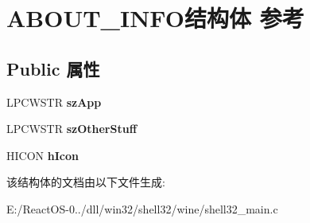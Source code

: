 \hypertarget{struct_a_b_o_u_t___i_n_f_o}{}\section{A\+B\+O\+U\+T\+\_\+\+I\+N\+F\+O结构体 参考}
\label{struct_a_b_o_u_t___i_n_f_o}
\subsection*{Public 属性}
\begin{DoxyCompactItemize}
\item 
\mbox{\label{struct_a_b_o_u_t___i_n_f_o_aedf6a1ef140deacedc1fbb95d2d4ed4b}} 
L\+P\+C\+W\+S\+TR {\bfseries sz\+App}
\item 
\mbox{\label{struct_a_b_o_u_t___i_n_f_o_a8f76a092c137831f7c9e707d89e52244}} 
L\+P\+C\+W\+S\+TR {\bfseries sz\+Other\+Stuff}
\item 
\mbox{\label{struct_a_b_o_u_t___i_n_f_o_aa056c0fff82d9ea9e21cf4e74de9725c}} 
H\+I\+C\+ON {\bfseries h\+Icon}
\end{DoxyCompactItemize}


该结构体的文档由以下文件生成\+:\begin{DoxyCompactItemize}
\item 
E\+:/\+React\+O\+S-\/0../dll/win32/shell32/wine/shell32\+\_\+main.\+c\end{DoxyCompactItemize}
